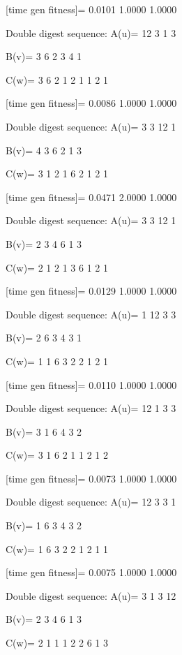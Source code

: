 [time gen fitness]=
    0.0101    1.0000    1.0000

Double digest sequence:
A(u)=
    12     3     1     3

B(v)=
     3     6     2     3     4     1

C(w)=
     3     6     2     1     2     1     1     2     1

[time gen fitness]=
    0.0086    1.0000    1.0000

Double digest sequence:
A(u)=
     3     3    12     1

B(v)=
     4     3     6     2     1     3

C(w)=
     3     1     2     1     6     2     1     2     1

[time gen fitness]=
    0.0471    2.0000    1.0000

Double digest sequence:
A(u)=
     3     3    12     1

B(v)=
     2     3     4     6     1     3

C(w)=
     2     1     2     1     3     6     1     2     1

[time gen fitness]=
    0.0129    1.0000    1.0000

Double digest sequence:
A(u)=
     1    12     3     3

B(v)=
     2     6     3     4     3     1

C(w)=
     1     1     6     3     2     2     1     2     1

[time gen fitness]=
    0.0110    1.0000    1.0000

Double digest sequence:
A(u)=
    12     1     3     3

B(v)=
     3     1     6     4     3     2

C(w)=
     3     1     6     2     1     1     2     1     2

[time gen fitness]=
    0.0073    1.0000    1.0000

Double digest sequence:
A(u)=
    12     3     3     1

B(v)=
     1     6     3     4     3     2

C(w)=
     1     6     3     2     2     1     2     1     1

[time gen fitness]=
    0.0075    1.0000    1.0000

Double digest sequence:
A(u)=
     3     1     3    12

B(v)=
     2     3     4     6     1     3

C(w)=
     2     1     1     1     2     2     6     1     3

